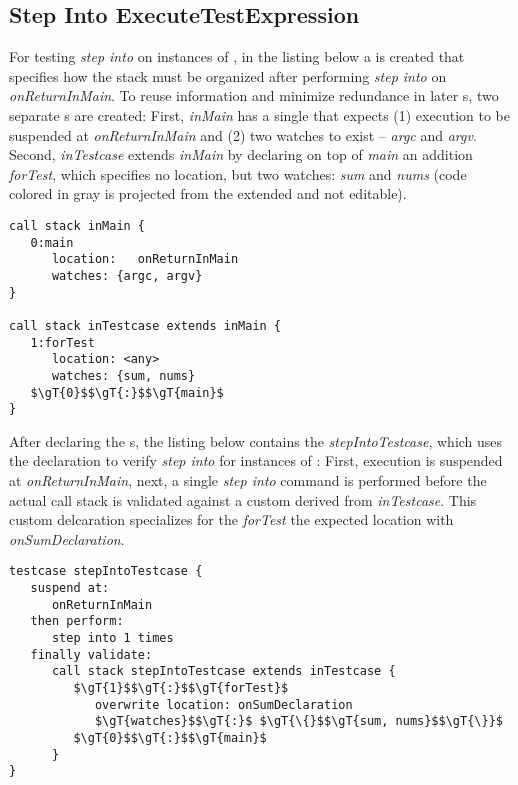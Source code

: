 \subsection{Step Into ExecuteTestExpression}

For testing \emph{step into} on instances of ,
in the listing below a  is created that specifies how
the stack must be organized after performing \emph{step
into} on \emph{onReturnInMain}. To reuse information and 
minimize redundance in later
s, two separate 
s are created: First, \emph{inMain} 
has a single  that expects (1) execution to be suspended at  
\emph{onReturnInMain} and (2) two watches to exist -- \emph{argc} and
\emph{argv}. Second, \emph{inTestcase} extends
\emph{inMain} by declaring on top of \emph{main} an addition
 \emph{forTest}, which specifies no location, but two
watches: \emph{sum} and \emph{nums} (code colored
in gray is projected from the extended  and not
editable).

\begin{lstlisting}[language=testingDSL]
call stack inMain {
   0:main
      location:   onReturnInMain
      watches: {argc, argv}                     
}
   
call stack inTestcase extends inMain {
   1:forTest
      location: <any>
      watches: {sum, nums}                  
   $\gT{0}$$\gT{:}$$\gT{main}$
}
\end{lstlisting}

After declaring the s, the listing below contains
the  \emph{stepIntoTestcase}, which uses the declaration to
verify \emph{step into} for instances of : First,
execution is suspended at \emph{onReturnInMain}, next, a single \emph{step into}
command is performed before the actual call stack is validated against
a custom  derived from \emph{inTestcase}.
This custom delcaration specializes for the 
\emph{forTest} the expected location with \emph{onSumDeclaration}.

\begin{lstlisting}[language=testingDSL]
testcase stepIntoTestcase {            
   suspend at: 
      onReturnInMain
   then perform:                         
      step into 1 times    
   finally validate:                         
      call stack stepIntoTestcase extends inTestcase {
         $\gT{1}$$\gT{:}$$\gT{forTest}$
            overwrite location: onSumDeclaration
            $\gT{watches}$$\gT{:}$ $\gT{\{}$$\gT{sum, nums}$$\gT{\}}$
         $\gT{0}$$\gT{:}$$\gT{main}$                       
      }
}
\end{lstlisting}

